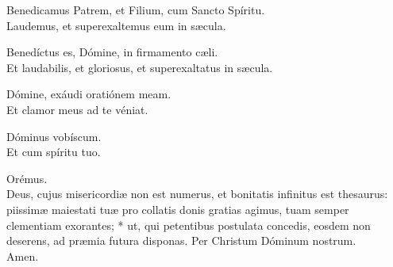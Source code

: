\begin{multicols}{2}
	\setlength{\parskip}{0.5em}
	\V Benedicamus Patrem, et Filium, cum Sancto Spíritu.\\
	\R Laudemus, et superexaltemus eum in s\ae{}cula.

	\V Benedíctus es, Dómine, in firmamento c\ae{}li.\\
	\R Et laudabilis, et gloriosus, et superexaltatus in s\ae{}cula.

	\V Dómine, exáudi oratiónem meam.\\
	\R Et clamor meus ad te véniat.

	\V Dóminus vobíscum.\\
	\R Et cum spíritu tuo.

	Orémus.\\
	Deus, cujus misericordi\ae{} non est numerus, et bonitatis infinitus est thesaurus:
	\maltese{} piissim\ae{} maiestati tu\ae{} pro collatis donis gratias agimus,
	tuam semper clementiam exorantes; * ut, qui petentibus postulata concedis,
	eosdem non deserens, ad pr\ae{}mia futura disponas.
	Per Christum Dóminum nostrum.\\
	\R Amen.
\end{multicols}
